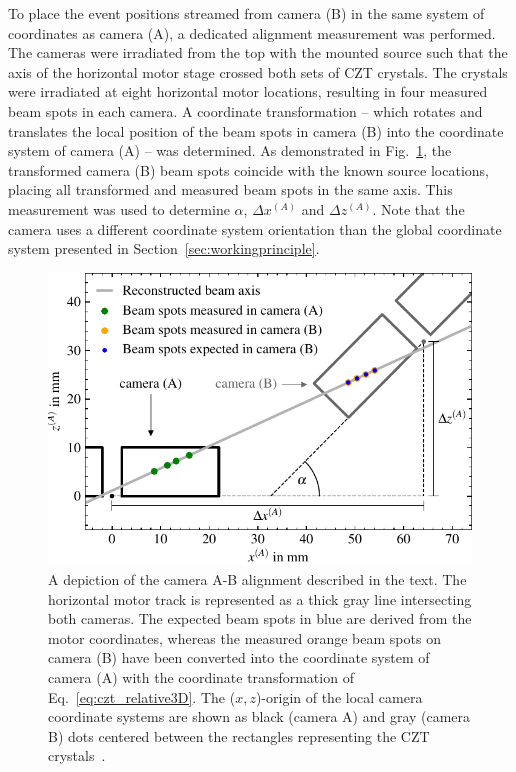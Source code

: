 To place the event positions streamed from camera (B) in the same system of coordinates as camera (A), a dedicated alignment measurement was performed. The cameras were irradiated from the top with the mounted \CsS{} source such that the axis of the horizontal motor stage crossed both sets of CZT crystals. The crystals were irradiated at eight horizontal motor locations, resulting in four measured beam spots in each camera. A coordinate transformation -- which rotates and translates the local position of the beam spots in camera (B) into the coordinate system of camera (A) -- was determined. As demonstrated in Fig.~\ref{fig:czt_relative2D}, the transformed camera (B) beam spots coincide with the known source locations, placing all transformed and measured beam spots in the same axis. This measurement was used to determine $\alpha$, $\Delta x^{(A)}$ and $\Delta z^{(A)}$. Note that the camera uses a different coordinate system orientation than the global coordinate system presented in Section~\ref{sec:workingprinciple}.
\begin{figure}[!tbh]
	\centering
	\includegraphics{figs/scanner/Camera_alignment_A.pdf}
	\caption{A depiction of the camera A-B alignment described in the text. The horizontal motor track is represented as a thick gray line intersecting both cameras. The expected beam spots in blue are derived from the motor coordinates, whereas the measured orange beam spots on camera (B) have been converted into the coordinate system of camera (A) with the coordinate transformation of Eq.~\ref{eq:czt_relative3D}. The ($x,z$)-origin of the local camera coordinate systems are shown as black (camera A) and gray (camera B) dots centered between the rectangles representing the CZT crystals~\cite{felix_comm}.}
	\label{fig:czt_relative2D}
\end{figure} 

